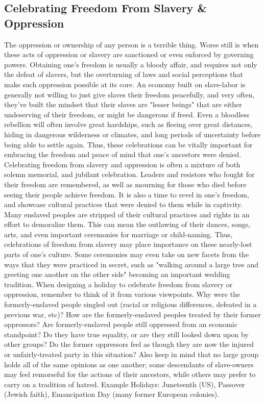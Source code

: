 \documentclass[10pt,a4paper,twoside,twocolumn,openany,bg=print,nodeprecatedcode]{dndbook}
\begin{document}
\subsection{Celebrating Freedom From Slavery \& Oppression}
The oppression or ownership of any person is a terrible thing. Worse still is when these acts of oppression or slavery are sanctioned or even enforced by governing powers. Obtaining one's freedom is usually a bloody affair, and requires not only the defeat of slavers, but the overturning of laws and social perceptions that make such oppression possible at its core. An economy built on slave-labor is generally not willing to just give slaves their freedom peacefully, and very often, they've built the mindset that their slaves are "lesser beings" that are either undeserving of their freedom, or might be dangerous if freed.
Even a bloodless rebellion will often involve great hardships, such as fleeing over great distances, hiding in dangerous wilderness or climates, and long periods of uncertainty before being able to settle again. Thus, these celebrations can be vitally important for embracing the freedom and peace of mind that one's ancestors were denied.
Celebrating freedom from slavery and oppression is often a mixture of both solemn memorial, and jubilant celebration. Leaders and resistors who fought for their freedom are remembered, as well as mourning for those who died before seeing their people achieve freedom. It is also a time to revel in one's freedom, and showcase cultural practices that were denied to them while in captivity. Many enslaved peoples are stripped of their cultural practices and rights in an effort to demoralize them. This can mean the outlawing of their dances, songs, arts, and even important ceremonies for marriage or child-naming. Thus, celebrations of freedom from slavery may place importance on these nearly-lost parts of one's culture. Some ceremonies may even take on new facets from the ways that they were practiced in secret, such as "walking around a large tree and greeting one another on the other side" becoming an important wedding tradition.
When designing a holiday to celebrate freedom from slavery or oppression, remember to think of it from various viewpoints. Why were the formerly-enslaved people singled out (racial or religious differences, defeated in a previous war, etc)? How are the formerly-enslaved peoples treated by their former oppressors? Are formerly-enslaved people still oppressed from an economic standpoint? Do they have true equality, or are they still looked down upon by other groups? Do the former oppressors feel as though they are now the injured or unfairly-treated party in this situation? Also keep in mind that no large group holds all of the same opinions as one another; some descendants of slave-owners may feel remorseful for the actions of their ancestors, while others may prefer to carry on a tradition of hatred.
Example Holidays: Juneteenth (US), Passover (Jewish faith), Emancipation Day (many former European colonies).
\end{document}

